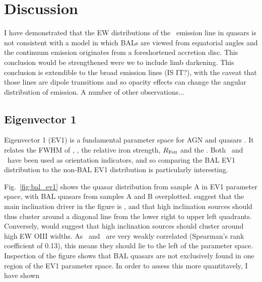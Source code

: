\section{Discussion}
\label{sec:discuss_ew}
I have demonstrated that the EW distributions of the \oiiifull\ emission line
in quasars is not consistent with a model in which BALs are 
viewed from equatorial angles and the continuum emission originates from
a foreshortened accretion disc. This conclusion would be strengthened were 
we to include limb darkening. This conclusion is extendible to the broad 
emission lines (IS IT?), with the caveat that those lines are dipole 
transitions and so opacity effects can change the angular distribution of 
emission. A number of other observations...

\subsection{Eigenvector 1}

Eigenvector 1 (EV1) is a fundamental parameter space for AGN and quasars
\citep{borosongreen,sulentic2000ev1,marziani2001,shenho2014}. It relates the 
FWHM of \hb, \fwh, the relative iron strength, $R_{{\rm Fe \textsc{ii}}}$ and
the \ewo. Both \ewo\ and \fwh\ have been used as orientation
indicators, and so comparing the BAL EV1 distribution to the non-BAL EV1 
distribution is particularly interesting. 

Fig.~\ref{fig:bal_ev1} shows the quasar distribution from sample A 
in EV1 parameter space, with BAL quasars from samples A and B overplotted.
\cite{shenho2014} suggest that the main inclination driver in the figure
is \fwh, and that high inclination sources should thus cluster around
a diagonal line from the lower right to upper left quadrants. Conversely,
\cite{risaliti2011} would suggest that high inclination sources should cluster
around high EW OIII widths. As \ewo\ and \fwh\ are very weakly correlated
(Spearman's rank coefficient of 0.13), this means they should lie to
the left of the parameter space. Inspection of the figure shows that 
BAL quasars are not exclusively found in one region of the EV1 parameter space. 
In order to assess this more quantitavely, I have shown 


